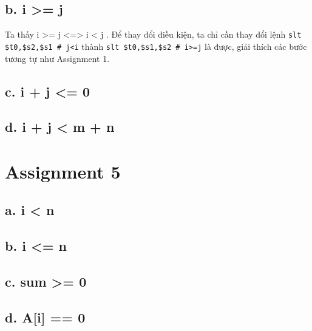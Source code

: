 \documentclass[12pt,a4paper,oneside]{article}
\begin{document}
\subsection*{b. i >= j}
Ta thấy i >= j <=> i < j . Để thay đổi điều kiện, ta chỉ cần thay đổi lệnh \lstinline{slt $t0,$s2,$s1 # j<i} thành \lstinline{slt $t0,$s1,$s2 # i>=j} là được, giải thích các bước tương tự như Assignment 1.






\subsection*{c. i + j <= 0}





\subsection*{d. i + j < m + n}


\pagebreak
\section{Assignment 5}
\subsection*{a. i < n}



\subsection*{b. i <= n}




\subsection*{c. sum >= 0}





\subsection*{d. A[i] == 0}

\pagebreak
\end{document}
